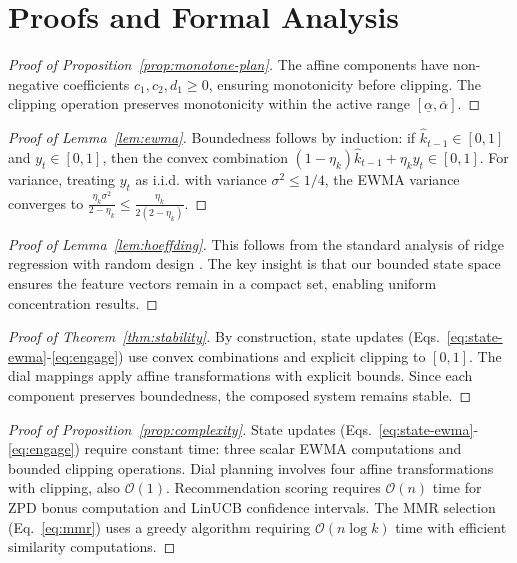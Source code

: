 \section{Proofs and Formal Analysis}
\label{app:proofs}

\begin{proof}[Proof of Proposition~\ref{prop:monotone-plan}]
The affine components have non-negative coefficients $c_1, c_2, d_1 \geq 0$, ensuring monotonicity before clipping. The clipping operation preserves monotonicity within the active range $[\underline{\alpha}, \overline{\alpha}]$. 
\end{proof}

\begin{proof}[Proof of Lemma~\ref{lem:ewma}]
Boundedness follows by induction: if $\widehat{k}_{t-1} \in [0,1]$ and $y_t \in [0,1]$, then the convex combination $(1-\eta_k)\widehat{k}_{t-1} + \eta_k y_t \in [0,1]$. For variance, treating $y_t$ as i.i.d. with variance $\sigma^2 \leq 1/4$, the EWMA variance converges to $\frac{\eta_k \sigma^2}{2-\eta_k} \leq \frac{\eta_k}{2(2-\eta_k)}$.
\end{proof}

\begin{proof}[Proof of Lemma~\ref{lem:hoeffding}]
This follows from the standard analysis of ridge regression with random design \cite{Abbasi2011}. The key insight is that our bounded state space ensures the feature vectors remain in a compact set, enabling uniform concentration results.
\end{proof}

\begin{proof}[Proof of Theorem~\ref{thm:stability}]
By construction, state updates (Eqs.~\eqref{eq:state-ewma}-\eqref{eq:engage}) use convex combinations and explicit clipping to $[0,1]$. The dial mappings apply affine transformations with explicit bounds. Since each component preserves boundedness, the composed system remains stable.
\end{proof}

\begin{proof}[Proof of Proposition~\ref{prop:complexity}]
State updates (Eqs.~\eqref{eq:state-ewma}-\eqref{eq:engage}) require constant time: three scalar EWMA computations and bounded clipping operations. Dial planning involves four affine transformations with clipping, also $\mathcal{O}(1)$. Recommendation scoring requires $\mathcal{O}(n)$ time for ZPD bonus computation and LinUCB confidence intervals. The MMR selection (Eq.~\eqref{eq:mmr}) uses a greedy algorithm requiring $\mathcal{O}(n \log k)$ time with efficient similarity computations.
\end{proof}

